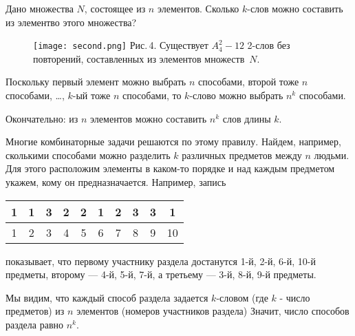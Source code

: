 \documentclass[11pt, a4paper, twocolumn]{report}
\begin{document}
Дано множества $N$, состоящее из $n$ элементов. Сколько $k$-слов можно составить из элементво этого множества?

\begin{figure}[t]
	\texttt{[image: second.png]}
	\footnotesize
	Рис.\,4. Существует $A^2_4 - 12$ 2-слов без повторений, составленных из элементов множеств~$N$.
\end{figure}


Поскольку первый элемент можно выбрать $n$ способами, второй тоже $n$ способами, \dots, $k$-ый тоже $n$ способами, то $k$-слово можно выбрать $n^k$ способами.

Окончательно: из $n$ элементов можно составить $n^k$ слов длины $k$.

Многие комбинаторные задачи решаются по этому правилу. Найдем, например, сколькими способами можно разделить $k$ различных предметов между $n$ людьми. Для этого расположим элементы в каком-то порядке и над каждым предметом укажем, кому он предназначается. Например, запись

\vspace{2mm}
\setlength{\extrarowheight}{3 mm}
\noindent
\begin{tabular}{|c|c|c|c|c|c|c|c|c|c|}
	\hline 1 & 1 & 3 & 2 & 2 & 1 & 2 & 3 & 3 & 1 \\ [5pt]
	\hline 1 & 2 & 3 & 4 & 5 & 6 & 7 & 8 & 9 & 10 \\ [5pt]
	\hline	
\end{tabular}
\setlength{\extrarowheight}{0 mm}

\vspace{2mm}
\noindent показывает, что первому участнику раздела достанутся 1-й, 2-й, 6-й, 10-й предметы, второму --- 4-й, 5-й, 7-й, а третьему --- 3-й, 8-й, 9-й предметы.

Мы видим, что каждый способ раздела задается $k$-словом (где $k$ - число предметов) из $n$ элементов (номеров участников раздела) Значит, число способов раздела равно $n^k$.
\end{document}
